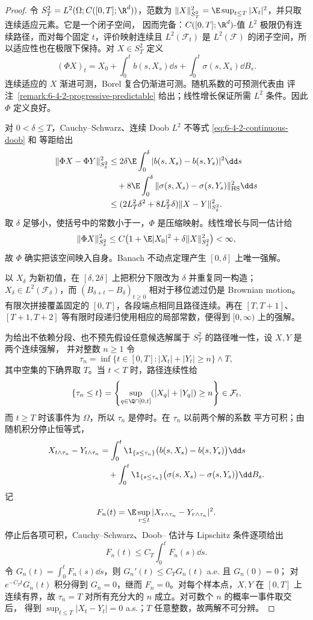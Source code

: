 \begin{proof}
令 $S_T^2=L^2(\Omega;C([0,T];\R^d))$，范数为
$\|X\|_{S_T^2}^2=\E\sup_{t\le T}|X_t|^2$，并只取连续适应元素。它是一个闭子空间，
因而完备：$C([0,T];\R^d)$-值 $L^2$ 极限仍有连续路径，而对每个固定 $t$，评价映射连续且
$L^2(\mathcal F_t)$ 是 $L^2(\mathcal F)$ 的闭子空间，所以适应性也在极限下保持。对
$X\in S_T^2$ 定义
\[
 (\Phi X)_t=X_0+\int_0^tb(s,X_s)\dd s
 +\int_0^t\sigma(s,X_s)\dd B_s.
\]
连续适应的 $X$ 渐进可测，Borel 复合仍渐进可测。随机系数的可预测代表由
评注~\ref{remark:6-4-2-progressive-predictable} 给出；线性增长保证所需 $L^2$ 条件。因此
$\Phi$ 定义良好。

对 $0<\delta\le T$，Cauchy--Schwarz、连续 Doob $L^2$ 不等式
\eqref{eq:6-4-2-continuous-doob} 和 \Ito{} 等距给出
\begin{align*}
 \|\Phi X-\Phi Y\|_{S_\delta^2}^2
 &\le2\delta\E\int_0^\delta|b(s,X_s)-b(s,Y_s)|^2\dd s\\
 &\quad+8\E\int_0^\delta
 \|\sigma(s,X_s)-\sigma(s,Y_s)\|_{\mathrm{HS}}^2\dd s\\
 &\le(2L_T^2\delta^2+8L_T^2\delta)\|X-Y\|_{S_\delta^2}^2.
\end{align*}
取 $\delta$ 足够小，使括号中的常数小于一，$\Phi$ 是压缩映射。线性增长与同一估计给
\[
 \|\Phi X\|_{S_\delta^2}^2
 \le C\bigl(1+\E|X_0|^2+\delta\|X\|_{S_\delta^2}^2\bigr)<\infty,
\]
故 $\Phi$ 确实把该空间映入自身。Banach 不动点定理产生 $[0,\delta]$ 上唯一强解。

以 $X_\delta$ 为新初值，在 $[\delta,2\delta]$ 上把积分下限改为 $\delta$ 并重复同一构造；
$X_\delta\in L^2(\mathcal F_\delta)$，而 $(B_{\delta+t}-B_\delta)_{t\ge0}$ 相对于移位滤过仍是
Brownian motion。有限次拼接覆盖固定的 $[0,T]$，各段端点相同且路径连续。再在
$[T,T+1]$、$[T+1,T+2]$ 等有限时段递归使用相应的局部常数，便得到 $[0,\infty)$ 上的强解。

为给出不依赖分段、也不预先假设任意候选解属于 $S_T^2$ 的路径唯一性，设 $X,Y$ 是两个连续强解，
并对整数 $n\ge1$ 令
\[
 \tau_n=\inf\{t\in[0,T]:|X_t|+|Y_t|\ge n\}\wedge T,
\]
其中空集的下确界取 $T$。当 $t<T$ 时，路径连续性给
\[
 \{\tau_n\le t\}
 =\left\{\sup_{q\in\Q\cap[0,t]}(|X_q|+|Y_q|)\ge n\right\}\in\mathcal F_t,
\]
而 $t\ge T$ 时该事件为 $\Omega$，所以 $\tau_n$ 是停时。在 $\tau_n$ 以前两个解的系数
平方可积；由随机积分停止恒等式，
\begin{align*}
 X_{t\wedge\tau_n}-Y_{t\wedge\tau_n}
 &=\int_0^t\1_{\{s\le\tau_n\}}
   \bigl(b(s,X_s)-b(s,Y_s)\bigr)\dd s\\
 &\quad+\int_0^t\1_{\{s\le\tau_n\}}
   \bigl(\sigma(s,X_s)-\sigma(s,Y_s)\bigr)\dd B_s .
\end{align*}
记
\[
 F_n(t)=\E\sup_{r\le t}|X_{r\wedge\tau_n}-Y_{r\wedge\tau_n}|^2.
\]
停止后各项可积，Cauchy--Schwarz、Doob--\Ito{} 估计与 Lipschitz 条件逐项给出
\[
 F_n(t)\le C_T\int_0^tF_n(s)\dd s.
\]
令 $G_n(t)=\int_0^tF_n(s)\dd s$，则 $G_n'(t)\le C_TG_n(t)$ a.e. 且 $G_n(0)=0$；
对 $e^{-C_Tt}G_n(t)$ 积分得到 $G_n=0$，继而 $F_n=0$。对每个样本点，$X,Y$ 在
$[0,T]$ 上连续有界，故 $\tau_n=T$ 对所有充分大的 $n$ 成立。对可数个 $n$ 的概率一事件取交后，
得到 $\sup_{t\le T}|X_t-Y_t|=0$ a.s.；$T$ 任意整数，故两解不可分辨。


\end{proof}
